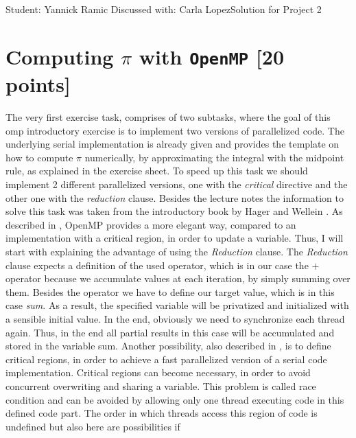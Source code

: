 \documentclass[unicode,11pt,a4paper,oneside,numbers=endperiod,openany]{scrartcl}
\begin{document}
\setassignment
{}

            {Student: Yannick Ramic}
            {Discussed with: Carla Lopez}{Solution for Project 2}{}
\newline

\assignmentpolicy

\section{Computing $\pi$ with \texttt{OpenMP} [20 points]}
The very first exercise task, comprises of two subtasks, where the goal of this omp introductory exercise is to 
implement two versions of parallelized code. The underlying serial implementation is already given and provides 
the template on how to compute $\pi$ numerically, by approximating the integral with the midpoint rule, as explained 
in the exercise sheet. To speed up this task we should implement 2 different parallelized versions, one with the 
\textit{critical} directive and the other one with the \textit{reduction} clause. Besides the lecture notes the 
information to solve this task was taken from the introductory book by Hager and Wellein \cite{HPC}.
\newline \indent
As described in \cite{HPC}, OpenMP provides a more elegant way, compared to an implementation with a critical region, 
in order to update a variable. Thus, I will start with explaining the advantage of using the \textit{Reduction} clause.
The \textit{Reduction} clause expects a definition of the used operator, which is in our case the $+$ operator because 
we accumulate values at each iteration, by simply summing over them. Besides the operator we have to define our target 
value, which is in this case \textit{sum}. As a result, the specified variable will be privatized and initialized with 
a sensible initial value. In the end, obviously we need to synchronize each thread again. Thus, in the end all partial results 
in this case will be accumulated and stored in the variable sum. \cite{HPC}
\newline \indent
Another possibility, also described in \cite{HPC}, is to define critical regions, in order to achieve a fast parallelized 
version of a serial code implementation. Critical regions can become necessary, in order to avoid concurrent overwriting and 
sharing a variable. This problem is called race condition and can be avoided by allowing only one thread executing code in this 
defined code part. The order in which threads access this region of code is undefined but also here are possibilities if 
\end{document}
